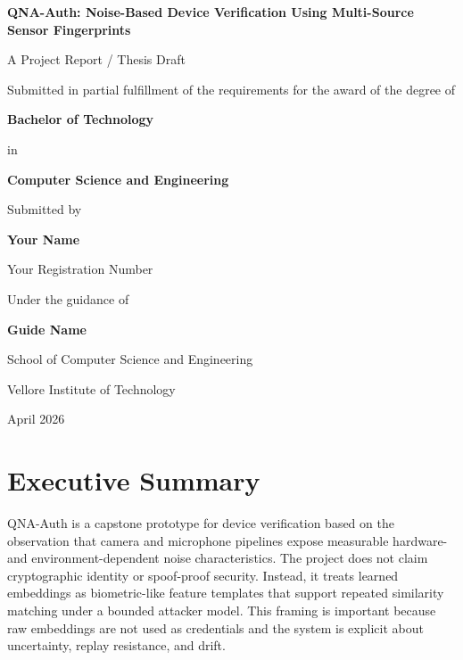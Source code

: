 \documentclass[12pt]{report}
\newcommand{\projecttitle}{QNA-Auth: Noise-Based Device Verification Using Multi-Source Sensor Fingerprints}
\newcommand{\studentname}{Your Name}
\newcommand{\regnumber}{Your Registration Number}
\newcommand{\guide}{Guide Name}
\newcommand{\department}{School of Computer Science and Engineering}
\newcommand{\institution}{Vellore Institute of Technology}
\newcommand{\submissionmonth}{April 2026}
\begin{document}
\pagestyle{plain}

\begin{titlepage}
    \centering
    \vspace*{1.2cm}
    {\Large\bfseries \projecttitle \par}
    \vspace{1.2cm}
    {\large A Project Report / Thesis Draft\par}
    \vspace{1.2cm}
    Submitted in partial fulfillment of the requirements for the award of the degree of\par
    \vspace{0.6cm}
    {\large\bfseries Bachelor of Technology\par}
    \vspace{0.6cm}
    in\par
    \vspace{0.4cm}
    {\large\bfseries Computer Science and Engineering\par}
    \vspace{1.4cm}
    Submitted by\par
    \vspace{0.4cm}
    {\large\bfseries \studentname\par}
    {\large \regnumber\par}
    \vspace{1.2cm}
    Under the guidance of\par
    \vspace{0.4cm}
    {\large\bfseries \guide\par}
    \vfill
    {\large \department\par}
    {\large \institution\par}
    \vspace{0.4cm}
    {\large \submissionmonth\par}
\end{titlepage}

\tableofcontents
\newpage

\chapter*{Executive Summary}
\justifying
QNA-Auth is a capstone prototype for device verification based on the observation that camera and microphone pipelines expose measurable hardware- and environment-dependent noise characteristics. The project does not claim cryptographic identity or spoof-proof security. Instead, it treats learned embeddings as biometric-like feature templates that support repeated similarity matching under a bounded attacker model. This framing is important because raw embeddings are not used as credentials and the system is explicit about uncertainty, replay resistance, and drift.
\end{document}
